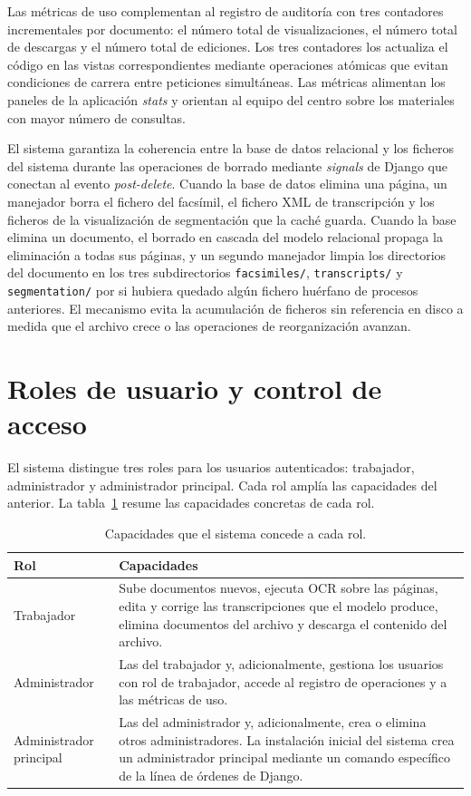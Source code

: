 Las métricas de uso complementan al registro de auditoría con tres contadores incrementales por documento: el número total de visualizaciones, el número total de descargas y el número total de ediciones. Los tres contadores los actualiza el código en las vistas correspondientes mediante operaciones atómicas que evitan condiciones de carrera entre peticiones simultáneas. Las métricas alimentan los paneles de la aplicación \textit{stats} y orientan al equipo del centro sobre los materiales con mayor número de consultas.

El sistema garantiza la coherencia entre la base de datos relacional y los ficheros del sistema durante las operaciones de borrado mediante \textit{signals} de Django que conectan al evento \textit{post-delete}. Cuando la base de datos elimina una página, un manejador borra el fichero del facsímil, el fichero XML de transcripción y los ficheros de la visualización de segmentación que la caché guarda. Cuando la base elimina un documento, el borrado en cascada del modelo relacional propaga la eliminación a todas sus páginas, y un segundo manejador limpia los directorios del documento en los tres subdirectorios \texttt{facsimiles/}, \texttt{transcripts/} y \texttt{segmentation/} por si hubiera quedado algún fichero huérfano de procesos anteriores. El mecanismo evita la acumulación de ficheros sin referencia en disco a medida que el archivo crece o las operaciones de reorganización avanzan.

\section{Roles de usuario y control de acceso}
\label{sec:roles-acceso}

El sistema distingue tres roles para los usuarios autenticados: trabajador, administrador y administrador principal. Cada rol amplía las capacidades del anterior. La tabla~\ref{tab:roles} resume las capacidades concretas de cada rol.

\begin{table}[!htbp]
	\centering
	\caption{Capacidades que el sistema concede a cada rol.}
	\label{tab:roles}
	\begin{tabular}{lp{10cm}}
		\toprule
		\textbf{Rol} & \textbf{Capacidades} \\
		\midrule
		Trabajador & Sube documentos nuevos, ejecuta OCR sobre las páginas, edita y corrige las transcripciones que el modelo produce, elimina documentos del archivo y descarga el contenido del archivo. \\
		\addlinespace
		Administrador & Las del trabajador y, adicionalmente, gestiona los usuarios con rol de trabajador, accede al registro de operaciones y a las métricas de uso. \\
		\addlinespace
		Administrador principal & Las del administrador y, adicionalmente, crea o elimina otros administradores. La instalación inicial del sistema crea un administrador principal mediante un comando específico de la línea de órdenes de Django. \\
		\bottomrule
	\end{tabular}
\end{table}

